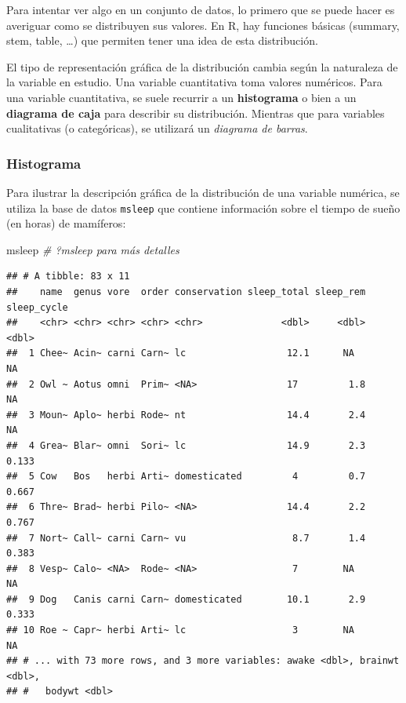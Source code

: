 \documentclass[]{article}
\newenvironment{Shaded}{\begin{snugshade}}{\end{snugshade}}
\newcommand{\CommentTok}[1]{\textcolor[rgb]{0.56,0.35,0.01}{\textit{#1}}}
\newcommand{\NormalTok}[1]{#1}
\numberwithin{ejcnt}{section}
\begin{document}
Para intentar ver algo en un conjunto de datos, lo primero que se puede hacer es averiguar como se distribuyen sus valores. En R, hay funciones básicas (summary, stem, table, \ldots) que permiten tener una idea de esta distribución.

El tipo de representación gráfica de la distribución cambia según la naturaleza de la variable en estudio. Una variable cuantitativa toma valores numéricos. Para una variable cuantitativa, se suele recurrir a un \textbf{histograma} o bien a un \textbf{diagrama de caja} para describir su distribución. Mientras que para variables cualitativas (o categóricas), se utilizará un \emph{diagrama de barras}.

\hypertarget{histograma}{%
\subsubsection{Histograma}\label{histograma}}

Para ilustrar la descripción gráfica de la distribución de una variable numérica, se utiliza la base de datos \texttt{msleep} que contiene información sobre el tiempo de sueño (en horas) de mamíferos:

\begin{Shaded}
\begin{Highlighting}[]
\NormalTok{msleep }\CommentTok{# ?msleep para más detalles}
\end{Highlighting}
\end{Shaded}

\begin{verbatim}
## # A tibble: 83 x 11
##    name  genus vore  order conservation sleep_total sleep_rem sleep_cycle
##    <chr> <chr> <chr> <chr> <chr>              <dbl>     <dbl>       <dbl>
##  1 Chee~ Acin~ carni Carn~ lc                  12.1      NA        NA    
##  2 Owl ~ Aotus omni  Prim~ <NA>                17         1.8      NA    
##  3 Moun~ Aplo~ herbi Rode~ nt                  14.4       2.4      NA    
##  4 Grea~ Blar~ omni  Sori~ lc                  14.9       2.3       0.133
##  5 Cow   Bos   herbi Arti~ domesticated         4         0.7       0.667
##  6 Thre~ Brad~ herbi Pilo~ <NA>                14.4       2.2       0.767
##  7 Nort~ Call~ carni Carn~ vu                   8.7       1.4       0.383
##  8 Vesp~ Calo~ <NA>  Rode~ <NA>                 7        NA        NA    
##  9 Dog   Canis carni Carn~ domesticated        10.1       2.9       0.333
## 10 Roe ~ Capr~ herbi Arti~ lc                   3        NA        NA    
## # ... with 73 more rows, and 3 more variables: awake <dbl>, brainwt <dbl>,
## #   bodywt <dbl>
\end{verbatim}
\end{document}
